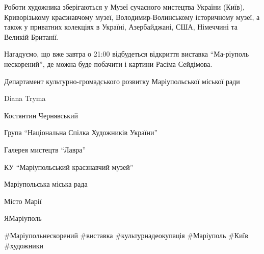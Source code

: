 Роботи художника зберігаються у Музеї сучасного мистецтва України  (Київ),
Криворізькому краєзнавчому музеї, Володимир-Волинському історичному музеї, а
також у приватних колекціях в Україні, Азербайджані, США, Німеччині та Великій
Британії. 

Нагадуємо, що вже завтра о 21:00 відбудеться відкриття виставка \enquote{Ма\hyp{}ріуполь
нескорений}, де можна буде побачити і картини Расіма Сейдімова.

Департамент культурно-громадського розвитку Маріупольської міської ради \par
Diana Tryma \par
Костянтин Чернявський \par
Група \enquote{Національна Спілка Художників України} \par
Галерея мистецтв \enquote{Лавра} \par
КУ \enquote{Маріупольський краєзнавчий музей} \par
Маріупольська міська рада \par
Місто Марії \par
ЯМаріуполь \par
\#Маріупольнескорений \#виставка \#культурнадеокупація \#Маріуполь \#Київ \#художники\par
